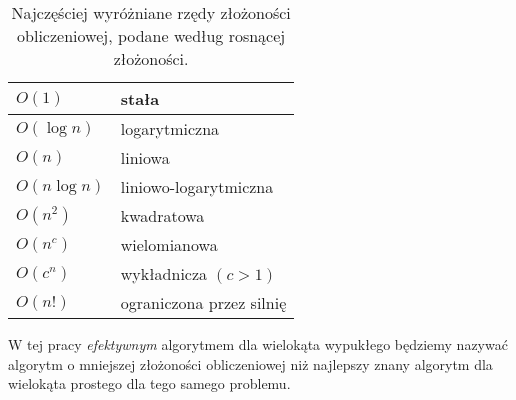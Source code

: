 \begin{table}[htb]
  \centering

  \begin{tabular}{ll}
    \toprule
    $O(1)$ & stała \\
    \midrule
    $O(\log n)$ & logarytmiczna \\
    \midrule
    $O(n)$ & liniowa \\
    \midrule
    $O(n \log n)$ & liniowo-logarytmiczna \\
    \midrule
    $O(n^2)$ & kwadratowa \\
    \midrule
    $O(n^c)$ & wielomianowa \\
    \midrule
    $O(c^n)$ & wykładnicza $(c > 1)$ \\
    \midrule
    $O(n!)$ & ograniczona przez silnię \\
    \bottomrule
  \end{tabular}

  \caption{Najczęściej wyróżniane rzędy złożoności obliczeniowej,
    podane według rosnącej złożoności.}
\end{table}

W tej pracy \emph{efektywnym} algorytmem dla wielokąta wypukłego
będziemy nazywać algorytm o mniejszej złożoności obliczeniowej niż
najlepszy znany algorytm dla wielokąta prostego dla tego samego
problemu.


